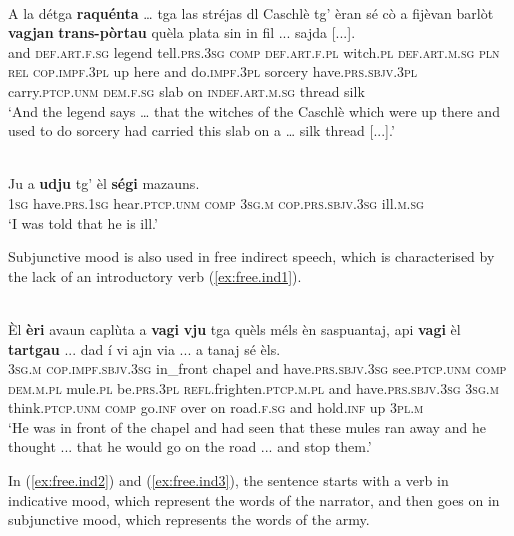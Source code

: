 \ea
\label{ex:subj3}
\\
\gll    A la détga \textbf{raquénta} … tga las stréjas dl Caschlè tg’ èran sé cò a fijèvan barlòt \textbf{vagjan} \textbf{trans-pòrtau} quèla plata sin\footnotemark{} in fil ... sajda [...].\\
and \textsc{def.art.f.sg} legend tell.\textsc{prs.3sg} {} \textsc{comp} \textsc{def.art.f.pl} witch.\textsc{pl} \textsc{def.art.m.sg} \textsc{pln} \textsc{rel} \textsc{cop.impf.3pl} up here and do.\textsc{impf.3pl} sorcery have.\textsc{prs.sbjv.3pl} carry.\textsc{ptcp.unm} \textsc{dem.f.sg} slab on \textsc{indef.art.m.sg} thread {} silk\\
\glt `And the legend says … that the witches of the Caschlè which were up there and used to do sorcery had carried this slab on a … silk thread [...].'
\z

\ea
\label{ex:subj4}
\\
\gll Ju a \textbf{udju} tg' èl \textbf{ségi} mazauns.\\
\textsc{1sg} have.\textsc{prs.1sg} hear.\textsc{ptcp.unm} \textsc{comp} \textsc{3sg.m} \textsc{cop.prs.sbjv.3sg} ill.\textsc{m.sg}\\
\glt `I was told that he is ill.'
\z

Subjunctive mood is also used in free indirect speech, which is characterised by the lack of an introductory verb (\ref{ex:free.ind1}).

\ea
\label{ex:free.ind1}
\\
\gll  Èl \textbf{èri} avaun caplùta a \textbf{vagi} \textbf{vju} tga quèls méls èn saspuantaj, api \textbf{vagi} èl \textbf{tartgau} ... dad í vi ajn via ... a tanaj sé èls.  \\
\textsc{3sg.m} \textsc{cop.impf.sbjv.3sg} in\_front chapel and have.\textsc{prs.sbjv.3sg} see.\textsc{ptcp.unm} \textsc{comp} \textsc{dem.m.pl} mule.\textsc{pl} be.\textsc{prs.3pl} \textsc{refl.}frighten.\textsc{ptcp.m.pl} and have.\textsc{prs.sbjv.3sg} \textsc{3sg.m} think.\textsc{ptcp.unm} {} \textsc{comp} go.\textsc{inf} over on road.\textsc{f.sg} {} and hold.\textsc{inf} up \textsc{3pl.m}\\
\glt `He was in front of the chapel and had seen that these mules ran away and he thought ... that he would go on the road ... and stop them.'
\z

In (\ref{ex:free.ind2}) and (\ref{ex:free.ind3}), the sentence starts with a verb in indicative mood, which represent the words of the narrator, and then goes on in subjunctive mood, which represents the words of the army.

